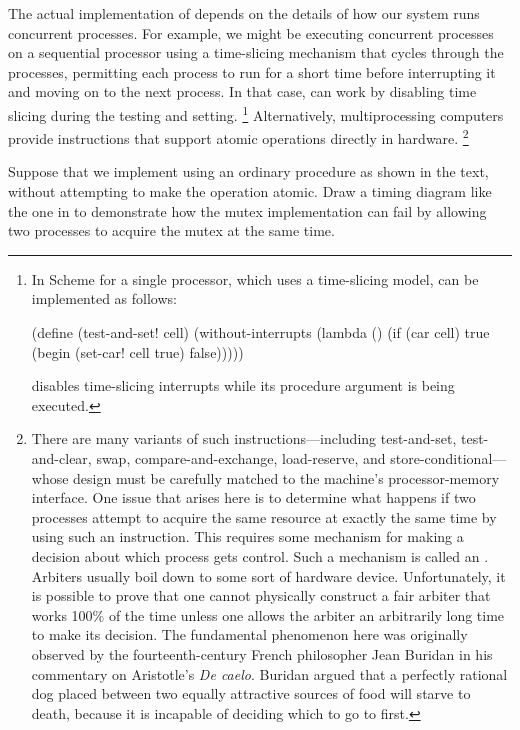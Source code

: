 The actual implementation of  depends on the details of how our system runs concurrent processes.
For example, we might be executing concurrent processes on a sequential processor using a time-slicing mechanism that cycles through the processes, permitting each process to run for a short time before interrupting it and moving on to the next process.
In that case,   can work by disabling time slicing during the testing and setting.%
\footnote{
	In  Scheme for a single processor, which uses a
	time-slicing model,  can be implemented as follows:
	\begin{smallscheme}
	  (define (test-and-set! cell)
	    (without-interrupts
	     (lambda ()
	       (if (car cell)
	           true
	           (begin (set-car! cell true)
	                  false)))))
	\end{smallscheme}
	 disables time-slicing interrupts while its procedure
	argument is being executed.
}
Alternatively, multiprocessing computers provide instructions that support atomic operations directly in hardware.%
\footnote{
	There are many variants of such instructions---including test-and-set, test-and-clear, swap, compare-and-exchange, load-reserve, and store-conditional---whose design must be carefully matched to the machine’s processor-memory interface.
	One issue that arises here is to determine what happens if two processes attempt to acquire the same resource at exactly the same time by using such an instruction.
	This requires some mechanism for making a decision about which process gets control.
	Such a mechanism is called an .
	Arbiters usually boil down to some sort of hardware device.
	Unfortunately, it is possible to prove that one cannot physically construct a fair arbiter that works 100\% of the time unless one allows the arbiter an arbitrarily long time to make its decision.
	The fundamental phenomenon here was originally observed by the fourteenth-century French philosopher Jean Buridan in his commentary on Aristotle’s \textit{De caelo}.
	Buridan argued that a perfectly rational dog placed between two equally attractive sources of food will starve to death, because it is incapable of deciding which to go to first.
}



\begin{exercise}
	\label{Exercise 3.46}
	Suppose that we implement   using an ordinary procedure as shown in the text, without attempting to make the operation atomic.
	Draw a timing diagram like the one in  to demonstrate how the mutex implementation can fail by allowing two processes to acquire the mutex at the same time.
\end{exercise}



